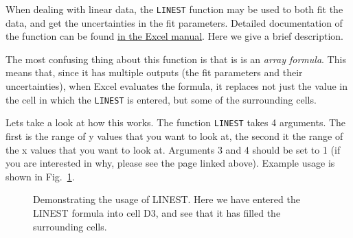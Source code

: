 \documentclass[10pt]{article}
\begin{document}
When dealing with linear data, the  \texttt{LINEST} function may be used to both fit the data, and get the uncertainties in the fit parameters.
Detailed documentation of the function can be found \href{https://support.microsoft.com/en-us/office/linest-function-84d7d0d9-6e50-4101-977a-fa7abf772b6d}{in the Excel manual}.
Here we give a brief description. 

The most confusing thing about this function is that is is an \textit{array formula}.
This means that, since it has multiple outputs (the fit parameters and their uncertainties), when Excel evaluates the formula, it replaces not just the value in the cell in which the \texttt{LINEST} is entered, but some of the surrounding cells. 

Lets take a look at how this works.
The function  \texttt{LINEST} takes 4 arguments.
The first is the range of y values that you want to look at, the second it the range of the x values that you want to look at.
Arguments 3 and 4 should be set to 1 (if you are interested in why, please see the page linked above).
Example usage is shown in Fig.~\ref{fig:linest}.

\begin{figure}
	\centering
	\begin{sheetpic}


		


	\end{sheetpic}
	\caption{Demonstrating the usage of LINEST. 
	Here we have entered the LINEST formula into cell D3, and see that it has filled the surrounding cells. }%
	\label{fig:linest}
\end{figure}
\end{document}
